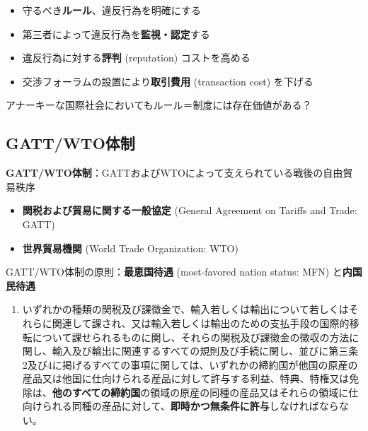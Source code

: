 \documentclass[
  xelatex,
  ja=standard]{bxjsarticle}
\providecommand{\tightlist}{%
  \setlength{\itemsep}{0pt}\setlength{\parskip}{0pt}}\usepackage{longtable,booktabs,array}
\begin{document}
\begin{itemize}
\tightlist
\item
  守るべき\textbf{ルール}、違反行為を明確にする
\item
  第三者によって違反行為を\textbf{監視・認定}する
\item
  違反行為に対する\textbf{評判} (reputation) コストを高める
\item
  交渉フォーラムの設置により\textbf{取引費用} (transaction cost)
  を下げる
\end{itemize}

アナーキーな国際社会においてもルール＝制度には存在価値がある？

\hypertarget{gattwtoux4f53ux5236}{%
\subsection{GATT/WTO体制}\label{gattwtoux4f53ux5236}}

\textbf{GATT/WTO体制}：GATTおよびWTOによって支えられている戦後の自由貿易秩序

\begin{itemize}
\tightlist
\item
  \textbf{関税および貿易に関する一般協定} (General Agreement on Tariffs
  and Trade: GATT)
\item
  \textbf{世界貿易機関} (World Trade Organization: WTO)
\end{itemize}

GATT/WTO体制の原則：\textbf{最恵国待遇} (most-favored nation status:
MFN) と\textbf{内国民待遇}

\begin{tcolorbox}[enhanced jigsaw, left=2mm, colframe=quarto-callout-note-color-frame, colback=white, coltitle=black, rightrule=.15mm, title=\textcolor{quarto-callout-note-color}{\faInfo}\hspace{0.5em}{\href{https://www.mofa.go.jp/mofaj/ecm/it/page1w_000136.html}{関税及び貿易に関する一般協定}　第1条}, arc=.35mm, toprule=.15mm, bottomrule=.15mm, leftrule=.75mm, bottomtitle=1mm, toptitle=1mm, titlerule=0mm, breakable, opacitybacktitle=0.6, colbacktitle=quarto-callout-note-color!10!white, opacityback=0]

\begin{enumerate}
\def\labelenumi{\arabic{enumi}.}
\tightlist
\item
  いずれかの種類の関税及び課徴金で、輸入若しくは輸出について若しくはそれらに関連して課され、又は輸入若しくは輸出のための支払手段の国際的移転について課せられるものに関し、それらの関税及び課徴金の徴収の方法に関し、輸入及び輸出に関連するすべての規則及び手続に関し、並びに第三条2及び4に掲げるすべての事項に関しては、いずれかの締約国が他国の原産の産品又は他国に仕向けられる産品に対して許与する利益、特典、特権又は免除は、\textbf{他のすべての締約国}の領域の原産の同種の産品又はそれらの領域に仕向けられる同種の産品に対して、\textbf{即時かつ無条件に許与}しなければならない。
\end{enumerate}

\end{tcolorbox}
\end{document}
